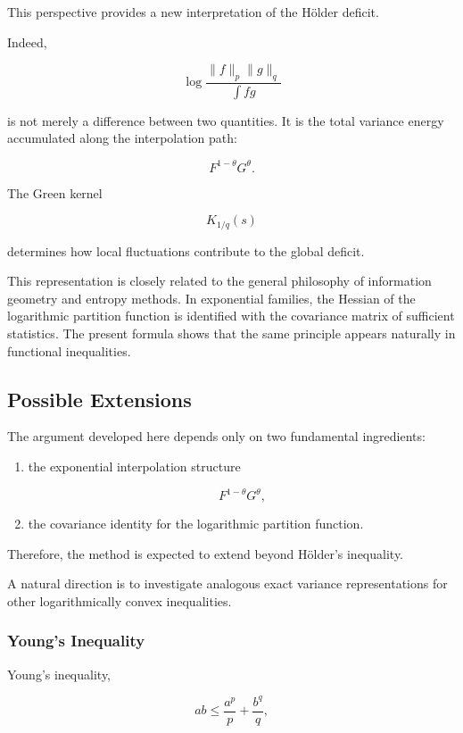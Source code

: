 \documentclass[11pt]{amsart}
\begin{document}
This perspective provides a new interpretation of the Hölder deficit.

Indeed,

\[
\log
\frac{
\|f\|_p\|g\|_q
}{
\int fg
}
\]

is not merely a difference between two quantities. It is the total
variance energy accumulated along the interpolation path:

\[
F^{1-\theta}G^\theta .
\]

The Green kernel

\[
K_{1/q}(s)
\]

determines how local fluctuations contribute to the global deficit.


This representation is closely related to the general philosophy of
information geometry and entropy methods. In exponential families,
the Hessian of the logarithmic partition function is identified with
the covariance matrix of sufficient statistics. The present formula
shows that the same principle appears naturally in functional
inequalities.


\subsection{Possible Extensions}


The argument developed here depends only on two fundamental
ingredients:

\begin{enumerate}

\item the exponential interpolation structure

\[
F^{1-\theta}G^\theta ,
\]

\item the covariance identity for the logarithmic partition
function.

\end{enumerate}


Therefore, the method is expected to extend beyond Hölder's
inequality.

A natural direction is to investigate analogous exact variance
representations for other logarithmically convex inequalities.


\subsubsection{Young's Inequality}


Young's inequality,

\[
ab\leq \frac{a^p}{p}+\frac{b^q}{q},
\]
\end{document}

